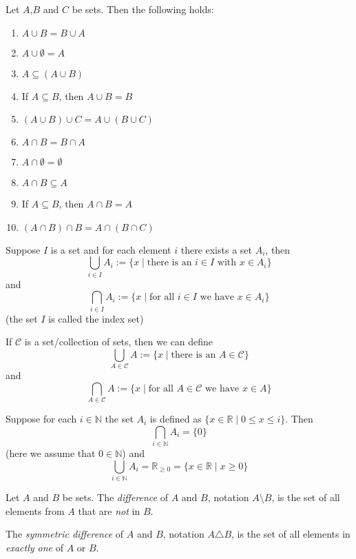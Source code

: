 \begin{proposition}
    Let $A$,$B$ and $C$ be sets. Then the following holds:
    \begin{enumerate}[label=(\alph*)]
        \item $ A \cup B = B \cup A $
        \item $ A \cup \emptyset = A $
        \item $ A \subseteq (A \cup B) $
        \item If $ A \subseteq B $, then $ A \cup B = B $
        \item $ (A \cup B) \cup C = A \cup (B \cup C)$
        \item $ A \cap B = B \cap A $
        \item $ A \cap \emptyset = \emptyset $
        \item $ A \cap B \subseteq A $
        \item If $ A \subseteq B $, then $ A \cap B = A $
        \item $ (A \cap B) \cap B = A \cap (B \cap C) $
    \end{enumerate}
\end{proposition}

\begin{definition}
    Suppose $I$ is a set and for each element $i$ there exists a set $A_i$, then
    $$ \bigcup_{i\in I}A_i := \{x \mid \text{there is an } i \in I \text{ with } x \in A_i\} $$
    and
    $$ \bigcap_{i \in I} A_i := \{x \mid \text{for all } i \in I \text{ we have } x \in A_i\} $$
    (the set $I$ is called the index set) \par
    If $ \mathscr{C} $ is a set/collection of sets, then we can define
    $$ \bigcup_{A \in \mathscr{C}}A := \{x \mid \text{there is an } A \in \mathscr{C}\} $$
    and
    $$ \bigcap_{A \in \mathscr{C}}A := \{x \mid \text{for all } A \in \mathscr{C} \text{ we have } x \in A\} $$
\end{definition}

\begin{example}
    Suppose for each $ i \in \mathbb{N} $ the set $A_i$ is defined as $\{x \in \mathbb{R} \mid 0 \leq x \leq i\}$. Then
    $$ \bigcap_{i \in \mathbb{N}}A_i = \{0\} $$
    (here we assume that $ 0 \in \mathbb{N} $) and
    $$ \bigcup_{i \in \mathbb{N}}A_i = \mathbb{R}_{\geq 0} = \{x \in \mathbb{R} \mid x \geq 0\} $$
\end{example}

\begin{definition}
    Let $A$ and $B$ be sets. The \emph{difference} of $A$ and $B$, notation $A \setminus B$, is the set of all elements from $A$ that are \emph{not} in $B$. \par
    The \emph{symmetric difference} of $A$ and $B$, notation $A \triangle B$, is the set of all elements in \emph{exactly one} of $A$ or $B$.
\end{definition}

